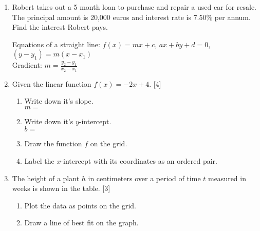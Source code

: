 \documentclass[12pt, twoside]{article}
\begin{document}
\begin{enumerate}
\item Robert takes out a 5 month loan to purchase and repair a used car for resale. The principal amount is 20,000 euros and interest rate is $7.50\%$ per annum. Find the interest Robert pays.
\newpage

Equations of a straight line: $f(x)=mx+c$, $ax+by+d=0$, $(y-y_1)=m(x-x_1)$\\[0.25cm]
Gradient: $\displaystyle m=\frac{y_2-y_1}{x_2-x_1}$ \vspace{1cm}
  
\item Given the linear function $f(x)=-2x+4$. \hfill [4]
\begin{multicols}{2}
\begin{enumerate}
  \item Write down it's slope.\\ $m=$
  \vspace{0.25cm}
  \item Write down it's $y$-intercept.\\ $b=$
  \vspace{0.25cm}
  \item Draw the function $f$ on the grid.
  \vspace{1cm}
  \item Label the $x$-intercept with its coordinates as an ordered pair.
\end{enumerate} \vspace{.5cm}
  \begin{center} 
  \end{center}
\end{multicols}

\item The height of a plant $h$ in centimeters over a period of time $t$ measured in weeks is shown in the table. \hfill [3]
\begin{enumerate}
  \item Plot the data as points on the grid.
  \item Draw a line of best fit on the graph.
\end{enumerate}
  \begin{center} 
\end{center}
\end{enumerate}
\end{document}
